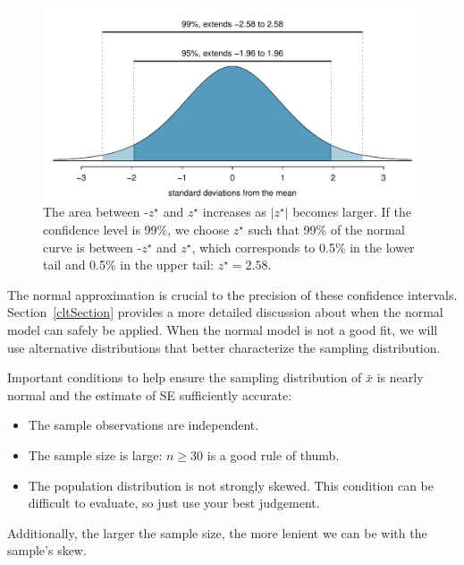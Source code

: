 \begin{figure}
\centering
\includegraphics[width=\textwidth]{ch_inference_for_props/figures/choosingZForCI/choosingZForCI}
\caption{The area between -$z^{\star}$ and $z^{\star}$ increases as $|z^{\star}|$ becomes larger. If the confidence level is 99\%, we choose $z^{\star}$ such that 99\% of the normal curve is between -$z^{\star}$ and $z^{\star}$, which corresponds to 0.5\% in the lower tail and 0.5\% in the upper tail: $z^{\star}=2.58$.}
\label{choosingZForCI}
\end{figure}

The normal approximation is crucial to the precision of these confidence intervals. Section~\ref{cltSection} provides a more detailed discussion about when the normal model can safely be applied. When the normal model is not a good fit, we will use alternative distributions that better characterize the sampling distribution.

\begin{termBox}{
Important conditions to help ensure the sampling distribution of $\bar{x}$ is nearly normal and the estimate of SE sufficiently accurate:
\begin{itemize}
\setlength{\itemsep}{0mm}
\item The sample observations are independent.
\item The sample size is large: $n\geq30$ is a good rule of thumb.
\item The population distribution is not strongly skewed. This condition can be difficult to evaluate, so just use your best judgement.
\end{itemize}
Additionally, the larger the sample size, the more lenient we can be with the sample's skew.}
\end{termBox}

